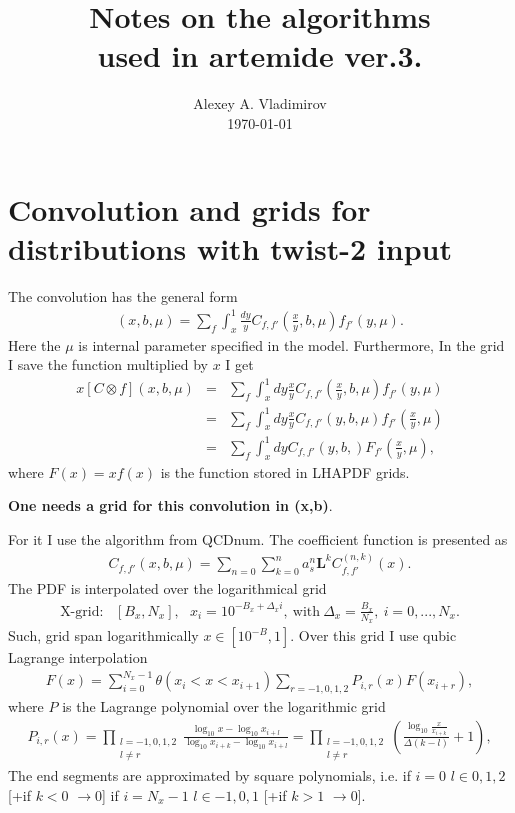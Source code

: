 \documentclass[prd,nofootinbib,eqsecnum,final]{revtex4}
\newcommand{\nn}{\nonumber}
\renewcommand{\(}{\left(}
\renewcommand{\)}{\right)}
\renewcommand{\[}{\left[}
\renewcommand{\]}{\right]}
\begin{document}
\title{Notes on the algorithms\\ used in artemide ver.3.}
\author{Alexey A. Vladimirov \\ \today}
\noaffiliation

\maketitle

\section{Convolution and grids for distributions with twist-2 input}

The convolution has the general form
\begin{eqnarray}
[C\otimes f](x,b,\mu)=\sum_f\int_x^1 \frac{dy}{y} C_{f,f'}\(\frac{x}{y},b,\mu\)f_{f'}(y,\mu).
\end{eqnarray}
Here the $\mu$ is internal parameter specified in the model. Furthermore, In the grid I save the function multiplied by $x$ I get
\begin{eqnarray}
x[C\otimes f](x,b,\mu)&=&
\sum_f\int_x^1 dy\frac{x}{y} C_{f,f'}\(\frac{x}{y},b,\mu\)f_{f'}(y,\mu)
\\\nn
&=&
\sum_f\int_x^1 dy\frac{x}{y} C_{f,f'}(y,b,\mu)f_{f'}\(\frac{x}{y},\mu\)
\\\nn
&=&
\sum_f\int_x^1 dy C_{f,f'}(y,b,)F_{f'}\(\frac{x}{y},\mu\),
\end{eqnarray}
where $F(x)=xf(x)$ is the function stored in LHAPDF grids.

\textbf{One needs a grid for this convolution in (x,b)}.

For it I use the algorithm from QCDnum. The coefficient function is presented as
\begin{eqnarray}
C_{f,f'}(x,b,\mu)=\sum_{n=0}\sum_{k=0}^n a_s^n \mathbf{L}^k C^{(n,k)}_{f,f'}(x).
\end{eqnarray}
The PDF is interpolated over the logarithmical grid
\begin{eqnarray}
\text{X-grid}:~~~[B_x,N_x],~~~x_i=10^{-B_x+\Delta_x i},~\text{with}~\Delta_x=\frac{B_x}{N_x},~i=0,...,N_x.
\end{eqnarray}
Such, grid span logarithmically $x\in[10^{-B},1]$. Over this grid I use qubic Lagrange interpolation
\begin{eqnarray}
F(x)=\sum_{i=0}^{N_x-1}\theta(x_i<x<x_{i+1})\sum_{r=-1,0,1,2} P_{i,r}(x)F(x_{i+r}),
\end{eqnarray}
where $P$ is the Lagrange polynomial over the logarithmic grid
\begin{eqnarray}
P_{i,r}(x)
=\prod_{\substack{l=-1,0,1,2\\ l\neq r}}\frac{\log_{10} x-\log_{10} x_{i+l}}{\log_{10} x_{i+k}-\log_{10} x_{i+l}}
=\prod_{\substack{l=-1,0,1,2\\ l\neq r}}\(\frac{\log_{10} \frac{x}{x_{i+k}}}{\Delta(k-l)}+1\),
\end{eqnarray}
The end segments are approximated by square polynomials, i.e. if $i=0$ $l\in{0,1,2}$ [+if $k<0$ $\to0$] if $i=N_x-1$ $l\in{-1,0,1}$ [+if $k>1$ $\to0$].
\end{document}
